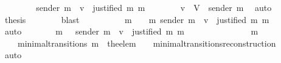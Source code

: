 \begin{isabellebody}
\ \ \isamarkupfalse%
{\isacharminus}\isanewline
\ \ \ \ \isamarkupfalse%
\ {\isachardoublequoteopen}sender\ m{\isacharprime}\ {\isacharequal}\ v\ {\isasymLongrightarrow}\ justified\ m\ m{\isacharprime}{\isachardoublequoteclose}\isanewline
\ \ \ \ \ \ \isamarkupfalse%
\ {\isacartoucheopen}v\ {\isasymin}\ V\ {\isacharminus}\ {\isacharbraceleft}sender\ m{\isacharprime}{\isacharbraceright}{\isacartoucheclose}\ \isamarkupfalse%
\ auto\isanewline
\ \ \ \ \isamarkupfalse%
\ {\isacharquery}thesis\isanewline
\ \ \ \ \ \ \isamarkupfalse%
\ blast\isanewline
\ \ \isamarkupfalse%
\isanewline
\ \ \isamarkupfalse%
\ \isamarkupfalse%
\ {\isachardoublequoteopen}{\isasymdots}\ {\isacharequal}\ {\isacharbraceleft}m{\isacharprime}{\isacharprime}\ {\isasymin}\ {\isasymsigma}\ {\isasymunion}\ {\isacharbraceleft}m{\isacharprime}{\isacharbraceright}{\isachardot}\ sender\ m{\isacharprime}{\isacharprime}\ {\isacharequal}\ v\ {\isasymand}\ justified\ m\ m{\isacharprime}{\isacharprime}{\isacharbraceright}{\isachardoublequoteclose}\isanewline
\ \ \ \ \isamarkupfalse%
\ auto\isanewline
\ \ \isamarkupfalse%
\ \isamarkupfalse%
\ {\isachardoublequoteopen}{\isasymdots}\ {\isacharequal}\ {\isacharbraceleft}m{\isacharprime}{\isacharprime}\ {\isasymin}\ {\isasymsigma}{\isacharprime}{\isachardot}\ sender\ m{\isacharprime}{\isacharprime}\ {\isacharequal}\ v\ {\isasymand}\ justified\ m\ m{\isacharprime}{\isacharprime}{\isacharbraceright}{\isachardoublequoteclose}\isanewline
\ \ \isamarkupfalse%
\ {\isacharminus}\isanewline
\ \ \ \ \isamarkupfalse%
\ {\isachardoublequoteopen}{\isasymsigma}{\isacharprime}\ {\isacharequal}\ \ {\isasymsigma}\ {\isasymunion}\ {\isacharbraceleft}m{\isacharprime}{\isacharbraceright}{\isachardoublequoteclose}\isanewline
\ \ \ \ \ \ \isamarkupfalse%
\ {\isacartoucheopen}{\isacharparenleft}{\isasymsigma}{\isacharcomma}\ {\isasymsigma}{\isacharprime}{\isacharparenright}\ {\isasymin}\ minimal{\isacharunderscore}transitions{\isacartoucheclose}\ {\isacartoucheopen}m{\isacharprime}\ {\isacharequal}\ the{\isacharunderscore}elem\ {\isacharparenleft}{\isasymsigma}{\isacharprime}\ {\isacharminus}\ {\isasymsigma}{\isacharparenright}{\isacartoucheclose}\ minimal{\isacharunderscore}transitions{\isacharunderscore}reconstruction\ \isamarkupfalse%
\ auto\ \isanewline
\ \ \ \ \isamarkupfalse%
\ \isamarkupfalse%

\end{isabellebody}
